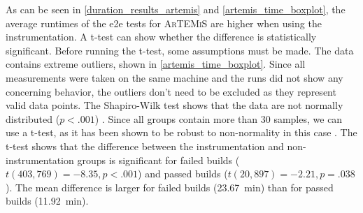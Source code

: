 As can be seen in \cref{duration_results_artemis} and \cref{artemis_time_boxplot}, the average runtimes of the \acs{e2e} tests for \textsc{ArTEMiS} are higher when using the instrumentation.
A t-test can show whether the difference is statistically significant.
Before running the t-test, some assumptions must be made.
The data contains extreme outliers, shown in \cref{artemis_time_boxplot}.
Since all measurements were taken on the same machine and the runs did not show any concerning behavior, the outliers don't need to be excluded as they represent valid data points.
The Shapiro-Wilk test shows that the data are not normally distributed ($p < .001$) \autocite{shapiro_analysis_1965}.
Since all groups contain more than 30 samples, we can use a t-test, as it has been shown to be robust to non-normality in this case \autocite{wilcox_introduction_2011}.
The t-test shows that the difference between the instrumentation and non-instrumentation groups is significant for failed builds ($t(403,769) = -8.35, p < .001$) and passed builds ($t(20,897) = -2.21, p = .038$).
The mean difference is larger for failed builds (\SI{23.67}{\minute}) than for passed builds (\SI{11.92}{\minute}).

